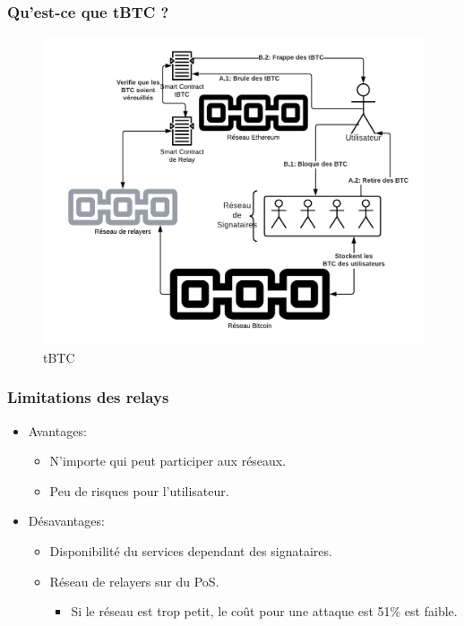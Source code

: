 \begin{frame}
  \frametitle{Qu’est-ce que tBTC ?}
  \begin{figure}
    \centering
    \includegraphics[scale = 0.22]{decentralisation/tBTC.png}
    \caption{tBTC}
  \end{figure}
\end{frame}

\begin{frame}
  \frametitle{Limitations des relays}
  \begin{itemize}
    \item Avantages:
    \begin{itemize}
      \item N'importe qui peut participer aux réseaux.
      \item Peu de risques pour l'utilisateur.
    \end{itemize}
    \item Désavantages:
    \begin{itemize}
      \item Disponibilité du services dependant des signataires.
      \item Réseau de relayers sur du PoS.
      \begin{itemize}
        \item Si le réseau est trop petit, le coût pour une attaque est 51\% est faible.
      \end{itemize}
    \end{itemize}  
  \end{itemize}
\end{frame}
